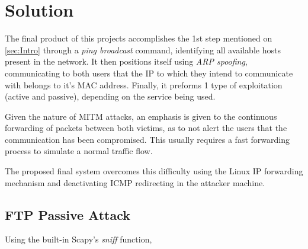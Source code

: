 \section{Solution}

The final product of this projects accomplishes the 1st step mentioned on 
\ref{sec:Intro} through a \textit{ping broadcast} command, identifying all 
available hosts present in the 
network.
It then positions itself using \textit{ARP spoofing}, communicating to both 
users that the IP to which they intend to communicate with belongs to it's MAC 
address. 
Finally, it preforms 1 type of exploitation (active and passive), depending on
the service being used.

Given the nature of MITM attacks, an emphasis is given to the continuous 
forwarding of packets between both victims, as to not alert the users that the 
communication has been compromised.
This usually requires a fast forwarding process to simulate a normal traffic 
flow. 

The proposed final system overcomes this difficulty using the Linux 
IP forwarding mechanism and deactivating ICMP redirecting in the attacker machine.

\subsection{FTP Passive Attack}

Using the built-in Scapy's \textit{sniff} function, 

